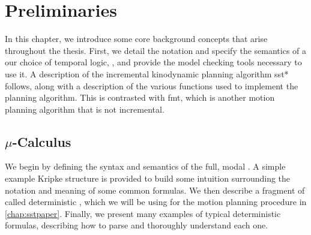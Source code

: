 \chapter{Preliminaries}\label{chap:prelims}

In this chapter, we introduce some core background concepts that arise throughout the thesis. First, we detail the notation and specify the semantics of a our choice of temporal logic, \mucalc{}, and provide the model checking tools necessary to use it. A description of the incremental kinodynamic planning algorithm \gls{sst}* follows, along with a description of the various functions used to implement the planning algorithm. This is contrasted with \gls{fmt}, which is another motion planning algorithm that is not incremental.


\section{\texorpdfstring{$\mu$-Calculus}{mu-Calculus}}

We begin by defining the syntax and semantics of the full, modal \mucalc{}. A simple example Kripke structure is provided to build some intuition surrounding the notation and meaning of some common \mucalc{} formulas. We then describe a fragment of \mucalc{} called deterministic \mucalc{}, which we will be using for the motion planning procedure in \autoref{chap:sstpaper}. Finally, we present many examples of typical deterministic \mucalc{} formulas, describing how to parse and thoroughly understand each one.




